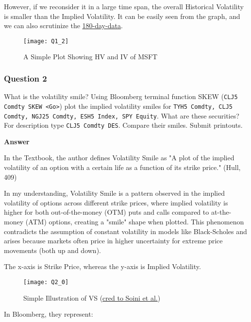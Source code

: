 \documentclass[letterpaper]{article}
\begin{document}
	  However, if we reconsider it in a large time span, the overall Historical Volatility is smaller than the Implied Volatility. It can be easily seen from the graph, and we can also scrutinize the  \href{https://www.alphaquery.com/stock/MSFT/volatility-option-statistics/180-day/historical-volatility}{180-day-data}.
	  
		
			\begin{figure}
				\caption{A Simple Plot Showing HV and IV of MSFT}
			\centering
			\texttt{[image: Q1\_2]}
		\end{figure}
	
		\clearpage
		
		\subsubsection*{Question 2}
		What is the volatility smile? Using Bloomberg terminal function SKEW (\texttt{CLJ5 Comdty SKEW <Go>}) plot the implied volatility smiles for \texttt{TYH5 Comdty, CLJ5 Comdty, NGJ25 Comdty, ESH5 Index, SPY Equity}. What are these securities? For description type \texttt{CLJ5 Comdty DES}. Compare their smiles. Submit printouts. 
		
		
		\textbf{Answer}
		
		In the Textbook, the author defines Volatility Smile as "A plot of the implied volatility of an option with a certain life as a function of its strike price." (Hull, 409)
		
		In my understanding, Volatility Smile is a pattern observed in the implied volatility of options across different strike prices, where implied volatility is higher for both out-of-the-money (OTM) puts and calls compared to at-the-money (ATM) options, creating a "smile" shape when plotted. This phenomenon contradicts the assumption of constant volatility in models like Black-Scholes and arises because markets often price in higher uncertainty for extreme price movements (both up and down). 
		
		The x-axis is Strike Price, whereas the y-axis is Implied Volatility.
		
		\begin{figure}[h]
			\caption{Simple Illustration of VS (\href{https://www.sciencedirect.com/science/article/pii/S0140988319302324}{cred to Soini et al.})}
			\centering
			\texttt{[image: Q2\_0]}
		\end{figure}
	
		In Bloomberg, they represent:
		
\end{document}
